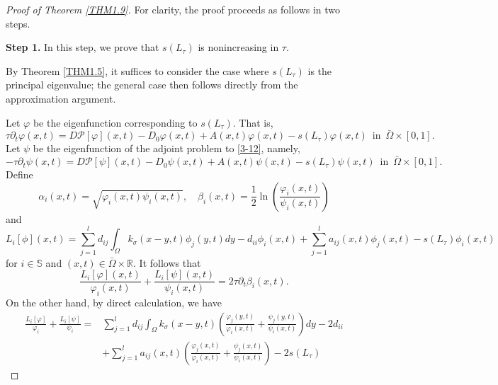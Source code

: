 \documentclass[11pt,reqno]{amsart}
\numberwithin{equation}{section}
\begin{document}
\begin{proof}[Proof of Theorem \ref{THM1.9}]
For clarity, the proof proceeds as follows in two steps.

\textbf{Step 1.} In this step, we prove that  $s(L_{\tau})$ is  nonincreasing in $\tau$.

By Theorem \ref{THM1.5}, it suffices to consider the case where $s(L_{\tau})$ is the principal eigenvalue; the general case then follows directly from the approximation argument.


Let $\varphi$ be the eigenfunction corresponding to $s(L_{\tau})$. That is,
\begin{equation}\label{3-12}
\tau \partial_{t}\varphi(x,t) =  D\mathcal{P}[\varphi](x,t) - D_{0}\varphi(x,t) + A(x,t)\varphi(x,t) - s(L_{\tau})\varphi(x,t) \enspace \text{in} \enspace\bar{\Omega}\times[0,1].
\end{equation}
Let $\psi$ be the eigenfunction of the adjoint problem  to \eqref{3-12}, namely,
\begin{equation*}
-\tau \partial_{t}\psi(x,t) =  D\mathcal{P}[\psi](x,t)-D_{0}\psi(x,t) + A(x,t)\psi(x,t) - s(L_{\tau})\psi(x,t) \enspace \text{in} \enspace\bar{\Omega}\times[0,1].
\end{equation*}
Define
\begin{equation*}
\alpha_{i}(x,t)=\sqrt{\varphi_{i}(x,t)\psi_{i}(x,t)},\quad \beta_{i}(x,t)=\frac{1}{2}\ln\left( \frac{\varphi_{i}(x,t)}{\psi_{i}(x,t)} \right)
\end{equation*}
and
\begin{equation*}
L_{i}[\phi](x,t)=\sum_{j=1}^{l}d_{ij}\int_{\Omega}k_{\sigma}(x-y,t)\phi_{j}(y,t)dy - d_{ii}\phi_{i}(x,t)
+\sum_{j=1}^{l}a_{ij}(x,t)\phi_{j}(x,t)-s(L_{\tau})\phi_{i}(x,t)
\end{equation*}
for $ i \in \mathbb{S}$ and $(x,t)\in \bar{\Omega}\times \mathbb{R}$.
It follows that
\begin{equation}\label{3-13}
\frac{L_{i}[\varphi](x,t)}{\varphi_{i}(x,t)}+\frac{L_{i}[\psi](x,t)}{\psi_{i}(x,t)}=2\tau \partial_{t}\beta_{i}(x,t).
\end{equation}
%
%
On the other hand, by direct calculation, we have
\begin{align}\label{3-14}
\nonumber
\frac{L_{i}[\varphi]}{\varphi_{i}}+\frac{L_{i}[\psi]}{\psi_{i}}
=&
\sum_{j=1}^{l} d_{ij}\int_{\Omega}k_{\sigma}(x-y,t) \left( \frac{\varphi_{j}(y,t)}{\varphi_{i}(x,t)} + \frac{\psi_{j}(y,t)}{\psi_{i}(x,t)} \right)dy
- 2d_{ii}
\\ \nonumber
&+\sum_{j=1}^{l} a_{ij}(x,t)\left( \frac{\varphi_{j}(x,t)}{\varphi_{i}(x,t)} + \frac{\psi_{j}(x,t)}{\psi_{i}(x,t)} \right) - 2s(L_{\tau})

\end{align}
\end{proof}
\end{document}
